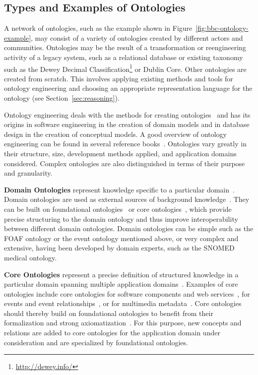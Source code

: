 \documentclass[a4paper,USenglish]{tgdk-v2021}
\newcommand{\myurl}[1]{\footnote{\url{#1}}}
\begin{document}
\subsection{Types and Examples of Ontologies}
\label{sec:ontologies}

A network of ontologies, such as the example shown in Figure~\ref{fig:bbc-ontology-example}, may consist of a variety of ontologies created by different actors and communities. 
Ontologies may be the result of a transformation or reengineering activity of a legacy system, such as a relational database or existing taxonomy such as the Dewey Decimal Classification\myurl{http://dewey.info/} or Dublin Core.
Other ontologies are created from scratch.
This involves applying existing methods and tools for ontology engineering and choosing an appropriate representation language for the ontology (see Section~\ref{sec:reasoning}). 

Ontology engineering deals with the methods for creating ontologies~\cite{GomezPerezFernandezLopezOntologicalEngineering} and has its origins in software engineering in the creation of domain models and in database design in the creation of conceptual models.
A good overview of ontology engineering can be found in several reference books~\cite{GomezPerezFernandezLopezOntologicalEngineering}.
Ontologies vary greatly in their structure, size, development methods applied, and application domains considered. 
Complex ontologies are also distinguished in terms of their purpose and granularity.

\textbf{Domain Ontologies} represent knowledge specific to a particular domain~\cite{Euzenat2007a,OberleMiddleware2006}. 
Domain ontologies are used as external sources of background knowledge~\cite{Euzenat2007a}.
They can be built on foundational ontologies~\cite{Oberle:2007:DES:1290204.1290385} or core ontologies~\cite{ScherpEtAlDesigningCoreOntologiesIOS2011}, which provide precise structuring to the domain ontology and thus improve interoperability between different domain ontologies.
Domain ontologies can be simple such as the FOAF ontology or the event ontology mentioned above, or very complex and extensive, having been developed by domain experts, such as the SNOMED medical ontology.

\textbf{Core Ontologies} represent a precise definition of structured knowledge in a particular domain spanning multiple application domains~\cite{ScherpEtAlDesigningCoreOntologiesIOS2011,OberleMiddleware2006}. 
Examples of core ontologies include core ontologies for software components and web services~\cite{OberleMiddleware2006}, for events and event relationships~\cite{emf-mtap}, or for multimedia metadata~\cite{www-m3o}.
Core ontologies should thereby build on foundational ontologies to benefit from their formalization and strong axiomatization~\cite{ScherpEtAlDesigningCoreOntologiesIOS2011}.
For this purpose, new concepts and relations are added to core ontologies for the application domain under consideration and are specialized by foundational ontologies.
 
\end{document}
